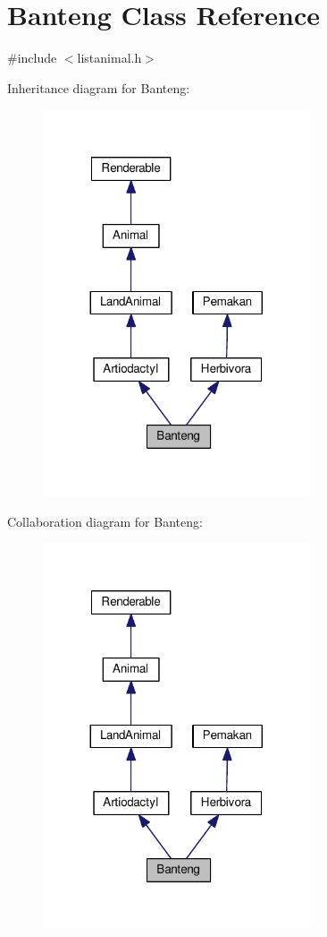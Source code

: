 \hypertarget{classBanteng}{}\section{Banteng Class Reference}
\label{classBanteng}


{\ttfamily \#include $<$listanimal.\+h$>$}



Inheritance diagram for Banteng\+:
\nopagebreak
\begin{figure}[H]
\begin{center}
\leavevmode
\includegraphics[width=224pt]{classBanteng__inherit__graph}
\end{center}
\end{figure}


Collaboration diagram for Banteng\+:
\nopagebreak
\begin{figure}[H]
\begin{center}
\leavevmode
\includegraphics[width=224pt]{classBanteng__coll__graph}
\end{center}
\end{figure}
